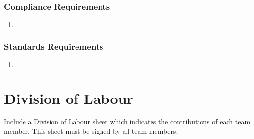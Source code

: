 \documentclass[]{article}
\begin{document}
\subsubsection{Compliance Requirements}
\label{ssub:compliance_requirements}
\begin{enumerate}[{LR-COMP}1. ]
	\item 
\end{enumerate}

\subsubsection{Standards Requirements}
\label{ssub:standards_requirements}
\begin{enumerate}[{LR-STD}1. ]
	\item 
\end{enumerate}



\appendix
\section{Division of Labour}
\label{sec:division_of_labour}
Include a Division of Labour sheet which indicates the contributions of each team member. This sheet must be signed by all team members.

\end{document}
